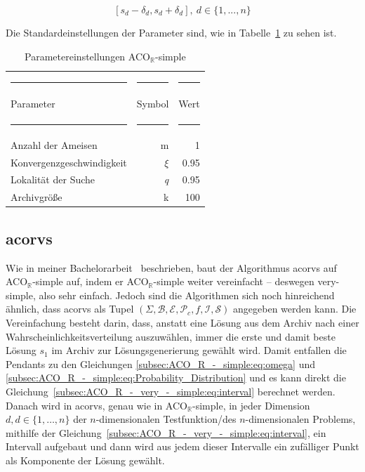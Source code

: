\documentclass[fontsize=12, a4aper]{scrartcl}
\begin{document}
	\begin{equation} \label{subsec:ACO_R_-_simple:eq:Suchintervall}
		[s_d - \delta_d, s_d + \delta_d], ~ d \in \{1, ..., n\}
	\end{equation}
	
	\noindent Die Standardeinstellungen der Parameter sind, wie in Tabelle~\ref{ACO_R_simple_Parametereinstellungen} zu sehen ist.
	
	\begin{table}[H]
		\fontsize{10pt}{12pt}
		
		\caption{Parametereinstellungen ACO\(_{\mathbb{R}}\)-simple}
		\label{ACO_R_simple_Parametereinstellungen}
		
		\begin{tabularx}{\textwidth}{l|r|r}
			
			\rule{4.6cm}{0.4pt} & \rule{4.6cm}{0.4pt}& \rule{4.6cm}{0.4pt}\\
			
			Parameter & Symbol & Wert\\
			
			\rule{4.6cm}{0.4pt} & \rule{4.6cm}{0.4pt}& \rule{4.6cm}{0.4pt}\\
			
			Anzahl der Ameisen & m & 1\\
			Konvergenzgeschwindigkeit & \(\xi\) & 0.95\\
			Lokalität der Suche & \textit{q} & 0.95\\
			Archivgröße & k & 100
			
			
		\end{tabularx}
		
	\end{table}
	
	\subsection{\acl{acorvs}} \label{subsec:ACO_R_-_very_-_simple}
	
	Wie in meiner Bachelorarbeit~\cite{FCM_2019} beschrieben, baut der Algorithmus \ac{acorvs} auf ACO\(_{\mathbb{R}}\)-simple auf, indem er ACO\(_{\mathbb{R}}\)-simple weiter vereinfacht -- deswegen very-simple, also sehr einfach. Jedoch sind die Algorithmen sich noch hinreichend ähnlich, dass \ac{acorvs} als Tupel \((\Sigma, \mathcal{B}, \mathcal{E}, \mathcal{P}_c, f, \mathcal{I}, \mathcal{S})\) angegeben werden kann. Die Vereinfachung besteht darin, dass, anstatt eine Lösung aus dem Archiv nach einer Wahrscheinlichkeitsverteilung auszuwählen, immer die erste und damit beste Lösung \(s_1\) im Archiv zur Lösungsgenerierung gewählt wird. Damit entfallen die Pendants zu den Gleichungen \ref{subsec:ACO_R_-_simple:eq:omega} und \ref{subsec:ACO_R_-_simple:eq:Probability_Distribution} und es kann direkt die Gleichung~\ref{subsec:ACO_R_-_very_-_simple:eq:interval} berechnet werden. Danach wird in \ac{acorvs}, genau wie in ACO\(_{\mathbb{R}}\)-simple, in jeder Dimension \(d, d \in \{1, \dots, n\}\) der \(n\)-dimensionalen Testfunktion/des \(n\)-dimensionalen Problems, mithilfe der Gleichung~\ref{subsec:ACO_R_-_very_-_simple:eq:interval}, ein Intervall aufgebaut und dann wird aus jedem dieser Intervalle ein zufälliger Punkt als Komponente der Lösung gewählt.
	
\end{document}
